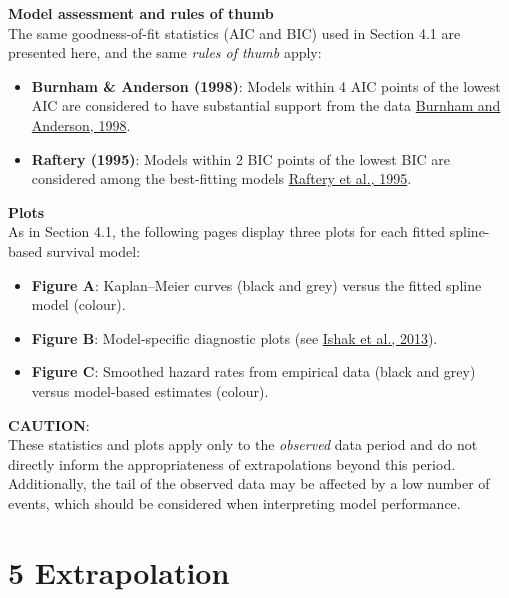 \documentclass[
]{article}
\providecommand{\tightlist}{%
  \setlength{\itemsep}{0pt}\setlength{\parskip}{0pt}}
\begin{document}
\textbf{Model assessment and rules of thumb}\\
The same goodness-of-fit statistics (AIC and BIC) used in Section 4.1
are presented here, and the same \emph{rules of thumb} apply:

\begin{itemize}
\tightlist
\item
  \textbf{Burnham \& Anderson (1998)}: Models within 4 AIC points of the
  lowest AIC are considered to have substantial support from the data
  \href{https://doi.org/10.1007/978-1-4757-2917-7}{Burnham and Anderson,
  1998}.\\
\item
  \textbf{Raftery (1995)}: Models within 2 BIC points of the lowest BIC
  are considered among the best-fitting models
  \href{https://doi.org/10.2307/271063}{Raftery et al., 1995}.
\end{itemize}

\textbf{Plots}\\
As in Section 4.1, the following pages display three plots for each
fitted spline-based survival model:

\begin{itemize}
\tightlist
\item
  \textbf{Figure A}: Kaplan--Meier curves (black and grey) versus the
  fitted spline model (colour).\\
\item
  \textbf{Figure B}: Model-specific diagnostic plots (see
  \href{https://doi.org/10.1007/s40273-013-0064-3}{Ishak et al.,
  2013}).\\
\item
  \textbf{Figure C}: Smoothed hazard rates from empirical data (black
  and grey) versus model-based estimates (colour).
\end{itemize}

\textbf{CAUTION}:\\
These statistics and plots apply only to the \emph{observed} data period
and do not directly inform the appropriateness of extrapolations beyond
this period.\\
Additionally, the tail of the observed data may be affected by a low
number of events, which should be considered when interpreting model
performance.

\clearpage

\clearpage

\section{5 Extrapolation}\label{extrapolation}
\end{document}
